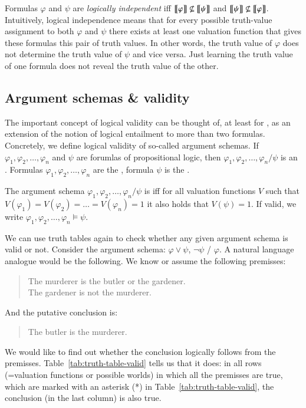 \documentclass[nobib,nofonts]{tufte-handout}
\newcommand{\proplog}{\acro{PropLog}}
\begin{document}
Formulas $\varphi$ and $\psi$ are \emph{logically independent} iff $\left [\! \left [ \varphi \right ]\! \right] \not \subseteq \left [\! \left [ \psi \right ]\! \right]$ and $\left [\! \left [ \psi \right ]\! \right] \not \subseteq \left [\! \left [ \varphi \right ]\! \right]$.
Intuitively, logical independence means that for every possible truth-value assignment to both $\varphi$ and $\psi$ there exists at least one valuation function that gives these formulas this pair of truth values.
In other words, the truth value of $\varphi$ does not determine the truth value of $\psi$ and vice versa.
Just learning the truth value of one formula does not reveal the truth value of the other.


\subsection{Argument schemas \& validity}

The important concept of logical validity can be thought of, at least for \proplog, as an extension of the notion of logical entailment to more than two formulas.
Concretely, we define logical validity of so-called argument schemas.
If $\varphi_1, \varphi_2, \dots, \varphi_n$ and $\psi$ are forumlas of propositional logic, then $\varphi_1, \varphi_2, \dots, \varphi_n / \psi$ is an .
Formulas $\varphi_1, \varphi_2, \dots, \varphi_n$ are the , formula $\psi$ is the .

The argument schema $\varphi_1, \varphi_2, \dots, \varphi_n / \psi$ is  iff for all
valuation functions $V$ such that $V(\varphi_1)=V(\varphi_2)= \dots = V(\varphi_n)=1$ it also holds
that $V(\psi) = 1$.
If valid, we write $\varphi_1, \varphi_2, \dots, \varphi_n \models \psi$.

We can use truth tables again to check whether any given argument schema is valid or not.
Consider the argument schema: $\varphi \vee \psi$, $\neg \psi$ / $\varphi$.
A natural language analogue would be the following.
We know or assume the following premisses:
\begin{quote}
  The murderer is the butler or the gardener. \\
  The gardener is not the murderer.
\end{quote}
And the putative conclusion is:
\begin{quote}
  The butler is the murderer.
\end{quote}
We would like to find out whether the conclusion logically follows from the premisses.
Table~\ref{tab:truth-table-valid} tells us that it does: in all rows (=valuation functions or possible worlds) in which all the premisses are true, which are marked with an asterisk (*) in Table~\ref{tab:truth-table-valid}, the conclusion (in the last column) is also true.
\end{document}
